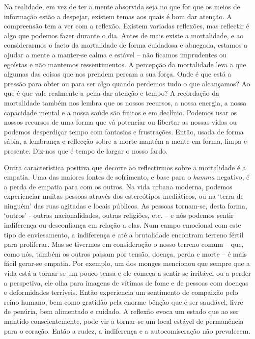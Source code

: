 Na realidade, em vez de ter a mente absorvida seja no que for que os meios de
informação estão a despejar, existem temas aos quais é bom dar
atenção.
A compreensão tem a ver com a reflexão. Existem variadas reflexões, mas
reflectir é algo que podemos fazer durante o dia. Antes de mais existe a
mortalidade, e ao considerarmos o facto da mortalidade de forma cuidadosa e
abnegada, estamos a ajudar a mente a manter-se calma e estável -- não ficamos
imprudentes ou egoístas e não mantemos ressentimentos. A percepção da
mortalidade leva a que algumas das coisas que nos prendem percam a sua força.
Onde é que está a pressão para obter ou para ser algo quando perdemos tudo o que
alcançamos? Ao que é que vale realmente a pena dar atenção e tempo? A recordação
da mortalidade também nos lembra que os nossos recursos, a nossa energia, a
nossa capacidade mental e a nossa saúde são finitos e em declínio. Podemos usar
os nossos recursos de uma forma que vá potenciar ou libertar as nossas vidas ou
podemos desperdiçar tempo com fantasias e frustrações. Então, usada de forma
sábia, a lembrança e reflecção sobre a morte mantém a mente em forma, limpa e
presente. Diz-nos que é tempo de largar o nosso fardo.

Outra característica positiva que decorre ao reflectirmos sobre a mortalidade é
a empatia. Uma das maiores fontes de sofrimento, e base para o \emph{kamma}
negativo, é a perda de empatia para com os outros. Na vida urbana moderna,
\mbox{podemos} experienciar muitas pessoas através dos estereótipos mediáticos, ou na
`terra de ninguém' das ruas agitadas e locais públicos. As pessoas tornam-se,
desta forma, `outros' - outras nacionalidades, outras religiões, etc. -- e nós
podemos sentir indiferença ou desconfiança em relação a elas. Num campo
emocional com este tipo de enviesamento, a indiferença e até a brutalidade
encontram terreno fértil para proliferar. Mas se tivermos em consideração o
nosso terreno comum -- que, como nós, também os outros passam por tensão,
doença, perda e morte -- é mais fácil gerar-se empatia. Por exemplo, um dos
monges mencionou que sempre que a vida está a tornar-se um pouco tensa e ele
começa a sentir-se irritável ou a perder a perspetiva, ele olha para imagens de
vítimas de fome e de pessoas com doenças e deformidades terríveis. Então
experiencia um sentimento de compaixão pelo reino humano, bem como gratidão pela
enorme bênção que é ser saudável, livre de penúria, bem alimentado e cuidado. A
reflexão evoca um estado que ao ser mantido conscientemente, pode vir a
tornar-se um local estável de permanência para o coração. Então a rudez, a
indiferença e a autocomiseração não prevalecem.

